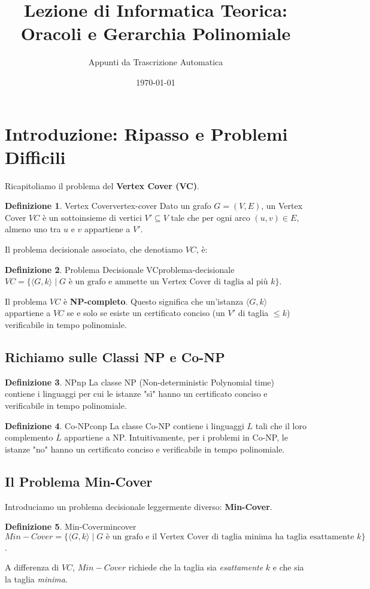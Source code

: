 \documentclass[a4paper]{article}
\title{Lezione di Informatica Teorica: Oracoli e Gerarchia Polinomiale}
\author{Appunti da Trascrizione Automatica}
\date{\today}
\theoremstyle{definition} %
\newtheorem{definition}{Definizione}
\begin{document}
\maketitle
\tableofcontents
\newpage

\section{Introduzione: Ripasso e Problemi Difficili}

Ricapitoliamo il problema del \textbf{Vertex Cover (VC)}.
\begin{definition}{Vertex Cover}{vertex-cover}
Dato un grafo $G=(V,E)$, un Vertex Cover $VC$ è un sottoinsieme di vertici $V' \subseteq V$ tale che per ogni arco $(u,v) \in E$, almeno uno tra $u$ e $v$ appartiene a $V'$.
\end{definition}

Il problema decisionale associato, che denotiamo $VC$, è:
\begin{definition}{Problema Decisionale VC}{problema-decisionale}
$VC = \{ \langle G, k \rangle \mid G \text{ è un grafo e ammette un Vertex Cover di taglia al più } k \}$.
\end{definition}
Il problema $VC$ è \textbf{NP-completo}. Questo significa che un'istanza $\langle G,k \rangle$ appartiene a $VC$ se e solo se esiste un certificato conciso (un $V'$ di taglia $\le k$) verificabile in tempo polinomiale.

\subsection{Richiamo sulle Classi NP e Co-NP}
\begin{definition}{NP}{np}
La classe NP (Non-deterministic Polynomial time) contiene i linguaggi per cui le istanze "sì" hanno un certificato conciso e verificabile in tempo polinomiale.
\end{definition}
\begin{definition}{Co-NP}{conp}
La classe Co-NP contiene i linguaggi $L$ tali che il loro complemento $\overline{L}$ appartiene a NP. Intuitivamente, per i problemi in Co-NP, le istanze "no" hanno un certificato conciso e verificabile in tempo polinomiale.
\end{definition}

\subsection{Il Problema Min-Cover}
Introduciamo un problema decisionale leggermente diverso: \textbf{Min-Cover}.
\begin{definition}{Min-Cover}{mincover}
$Min-Cover = \{ \langle G, k \rangle \mid G \text{ è un grafo e il Vertex Cover di taglia minima ha taglia esattamente } k \}$.
\end{definition}
A differenza di $VC$, $Min-Cover$ richiede che la taglia sia \emph{esattamente} $k$ e che sia la taglia \emph{minima}.
\end{document}
